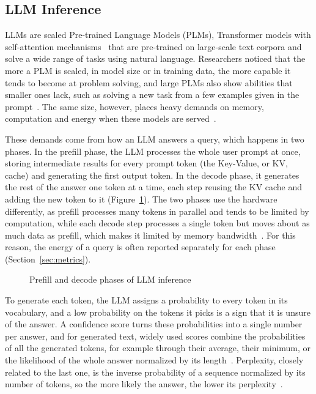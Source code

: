 \documentclass[cic,dipl,english]{infufrgs}
\begin{document}
\subsection{LLM Inference}
\label{sec:llm-background}

LLMs are scaled Pre-trained Language Models (PLMs), Transformer models with
self-attention mechanisms~\cite{vaswani2017attention} that are pre-trained on large-scale
text corpora and solve a wide range of tasks using natural language. Researchers noticed
that the more a PLM is scaled, in model size or in training data, the more capable it
tends to become at problem solving, and large PLMs also show abilities that smaller ones
lack, such as solving a new task from a few examples given in the
prompt~\cite{zhao2023survey}. The same size, however, places heavy demands on memory,
computation and energy when these models are served~\cite{chen2026network}.

These demands come from how an LLM answers a query, which happens in two
phases. In the prefill phase, the LLM processes the whole user prompt at once, storing
intermediate results for every prompt token (the Key-Value, or KV, cache) and generating
the first output token. In the decode phase, it generates the rest of the answer one
token at a time, each step reusing the KV cache and adding the new token to it
(Figure~\ref{fig:prefill-decode}). The two phases use the hardware differently, as prefill processes many tokens in
parallel and tends to be limited by computation, while each decode step processes a single token
but moves about as much data as prefill, which makes it limited by memory
bandwidth~\cite{zhong2024distserve}. For this reason, the energy of a query is often
reported separately for each phase (Section~\ref{sec:metrics}).

\begin{figure}[htb]
  \centering
  \caption{Prefill and decode phases of LLM inference}
  \label{fig:prefill-decode}
  \vspace{6pt}
  
\end{figure}

To generate each token, the LLM assigns a probability to every token in its vocabulary,
and a low probability on the tokens it picks is a sign that it is unsure of the
answer. A confidence score turns these probabilities into
a single number per answer, and for generated text, widely used scores combine the
probabilities of all the generated tokens, for example through their average, their
minimum, or the likelihood of the whole answer normalized by its
length~\cite{geng2023survey}. Perplexity, closely related to the last one, is the
inverse probability of a sequence normalized by its number of tokens, so the more likely
the answer, the lower its perplexity~\cite[ch.~3]{jurafsky2026speech}.
\end{document}
